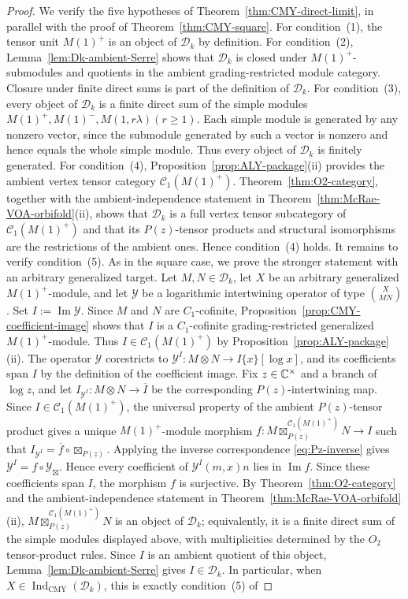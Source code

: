 \documentclass[10pt,a4paper]{amsart}
\numberwithin{equation}{section} \newtheorem{thm}{Theorem}[section] \newtheorem{lem}[thm]{Lemma} \newtheorem{ex}[thm]{Example} \newtheorem{prop}[thm]{Proposition} \newtheorem{cor}[thm]{Corollary} \newtheorem{defi}[thm]{Definition} \newtheorem{rmk}[thm]{Remark} \newtheorem{notation}[thm]{Notation}
\newcommand{\Dk}{\mathcal D_k}
\newcommand{\IndCMY}{\operatorname{Ind}_{\mathrm{CMY}}}
\begin{document}
\begin{proof}
We verify the five hypotheses of Theorem~\ref{thm:CMY-direct-limit}, in parallel with the proof of Theorem~\ref{thm:CMY-square}. For condition~\textnormal{(1)}, the tensor unit $M(1)^+$ is an object of $\Dk$ by definition. For condition~\textnormal{(2)}, Lemma~\ref{lem:Dk-ambient-Serre} shows that $\Dk$ is closed under $M(1)^+$-submodules and quotients in the ambient grading-restricted module category. Closure under finite direct sums is part of the definition of $\Dk$. For condition~\textnormal{(3)}, every object of $\Dk$ is a finite direct sum of the simple modules \(M(1)^+, M(1)^-, M(1,r\lambda)(r\ge1).\) Each simple module is generated by any nonzero vector, since the submodule generated by such a vector is nonzero and hence equals the whole simple module. Thus every object of $\Dk$ is finitely generated. For condition~\textnormal{(4)}, Proposition~\ref{prop:ALY-package}(ii) provides the ambient vertex tensor category $\mathcal C_1(M(1)^+)$. Theorem~\ref{thm:O2-category}, together with the ambient-independence statement in Theorem~\ref{thm:McRae-VOA-orbifold}(ii), shows that $\Dk$ is a full vertex tensor subcategory of $\mathcal C_1(M(1)^+)$ and that its $P(z)$-tensor products and structural isomorphisms are the restrictions of the ambient ones. Hence condition~\textnormal{(4)} holds. It remains to verify condition~\textnormal{(5)}. As in the square case, we prove the stronger statement with an arbitrary generalized target. Let $M,N\in\Dk$, let $X$ be an arbitrary generalized $M(1)^+$-module, and let $\mathcal Y$ be a logarithmic intertwining operator of type \(\binom{X}{M N}\). Set $I:=\operatorname{Im}\mathcal Y$. Since $M$ and $N$ are $C_1$-cofinite, Proposition~\ref{prop:CMY-coefficient-image} shows that $I$ is a $C_1$-cofinite grading-restricted generalized $M(1)^+$-module. Thus \(I\in\mathcal C_1(M(1)^+)\) by Proposition~\ref{prop:ALY-package}(ii). The operator $\mathcal Y$ corestricts to \(\mathcal Y^I:M\otimes N\longrightarrow I\{x\}[\log x]\), and its coefficients span $I$ by the definition of the coefficient image. Fix $z\in\mathbb{C}^\times$ and a branch of $\log z$, and let \(I_{\mathcal Y^I}:M\otimes N\longrightarrow\overline I\) be the corresponding $P(z)$-intertwining map. Since $I\in\mathcal C_1(M(1)^+)$, the universal property of the ambient $P(z)$-tensor product gives a unique $M(1)^+$-module morphism \(f:M\boxtimes^{\mathcal C_1(M(1)^+)}_{P(z)}N\longrightarrow I\) such that \(I_{\mathcal Y^I}=\overline f\circ\boxtimes_{P(z)}\). Applying the inverse correspondence \eqref{eq:Pz-inverse} gives $\mathcal Y^I=f\circ\mathcal Y_{\boxtimes}$. Hence every coefficient of $\mathcal Y^I(m,x)n$ lies in $\operatorname{Im}f$. Since these coefficients span $I$, the morphism $f$ is surjective. By Theorem~\ref{thm:O2-category} and the ambient-independence statement in Theorem~\ref{thm:McRae-VOA-orbifold}(ii), \(M\boxtimes^{\mathcal C_1(M(1)^+)}_{P(z)}N\) is an object of $\Dk$; equivalently, it is a finite direct sum of the simple modules displayed above, with multiplicities determined by the $O_2$ tensor-product rules. Since $I$ is an ambient quotient of this object, Lemma~\ref{lem:Dk-ambient-Serre} gives $I\in\Dk$. In particular, when $X\in\IndCMY(\Dk)$, this is exactly condition~\textnormal{(5)} of 
\end{proof}
\end{document}
